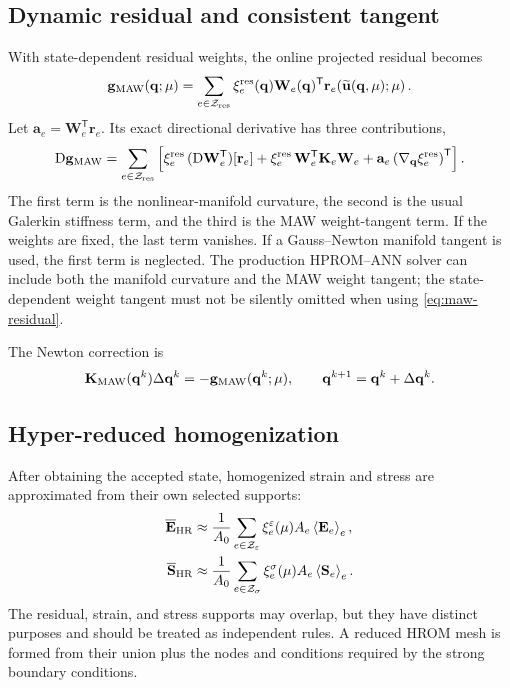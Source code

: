 \documentclass[11pt,a4paper]{article}
\newcommand{\transpose}{^{\mathsf T}}
\newcommand{\avg}[1]{\left\langle #1 \right\rangle}
\newcommand{\vect}[1]{\mathbf{#1}}
\newcommand{\mat}[1]{\mathbf{#1}}
\newcommand{\set}[1]{\mathcal{#1}}
\begin{document}
\subsection{Dynamic residual and consistent tangent}

With state-dependent residual weights, the online projected residual becomes
\begin{equation}
  \vect g_{\rm MAW}(\vect q;\vect\mu)
  =\sum_{e\in\set Z_{\rm res}}
   \xi_e^{\rm res}(\vect q)
   \mat W_e(\vect q)\transpose
   \vect r_e\!\left(\widetilde{\vect u}(\vect q,\vect\mu);\vect\mu\right).
  \label{eq:maw-residual}
\end{equation}
Let \(\vect a_e=\mat W_e\transpose\vect r_e\).  Its exact directional
derivative has three contributions,
\begin{equation}
  \mathrm D\vect g_{\rm MAW}
  =\sum_{e\in\set Z_{\rm res}}
    \left[
      \xi_e^{\rm res}\,(\mathrm D\mat W_e\transpose)[\vect r_e]
      +\xi_e^{\rm res}\,\mat W_e\transpose\mat K_e\mat W_e
      +\vect a_e\left(\nabla_{\vect q}\xi_e^{\rm res}\right)\transpose
    \right].
  \label{eq:maw-tangent}
\end{equation}
The first term is the nonlinear-manifold curvature, the second is the usual
Galerkin stiffness term, and the third is the MAW weight-tangent term.  If the
weights are fixed, the last term vanishes.  If a Gauss--Newton manifold tangent
is used, the first term is neglected.  The production HPROM--ANN solver can
include both the manifold curvature and the MAW weight tangent; the
state-dependent weight tangent must not be silently omitted when using
\cref{eq:maw-residual}.

The Newton correction is
\begin{equation}
  \mat K_{\rm MAW}(\vect q^k)\Delta\vect q^k
  =-\vect g_{\rm MAW}(\vect q^k;\vect\mu),
  \qquad
  \vect q^{k+1}=\vect q^k+\Delta\vect q^k.
  \label{eq:maw-newton}
\end{equation}

\subsection{Hyper-reduced homogenization}
\label{sec:hom-maw}

After obtaining the accepted state, homogenized strain and stress are
approximated from their own selected supports:
\begin{align}
  \overline{\mat E}_{\rm HR}
  &\approx
  \frac{1}{A_0}
  \sum_{e\in\set Z_{\varepsilon}}
    \xi_e^{\varepsilon}(\vect\mu)
    A_e\avg{\mat E_e}_e,
  \label{eq:maw-hom-eps}\\
  \overline{\mat S}_{\rm HR}
  &\approx
  \frac{1}{A_0}
  \sum_{e\in\set Z_{\sigma}}
    \xi_e^{\sigma}(\vect\mu)
    A_e\avg{\mat S_e}_e.
  \label{eq:maw-hom-sig}
\end{align}
The residual, strain, and stress supports may overlap, but they have distinct
purposes and should be treated as independent rules.  A reduced HROM mesh is
formed from their union plus the nodes and conditions required by the strong
boundary conditions.
\end{document}
